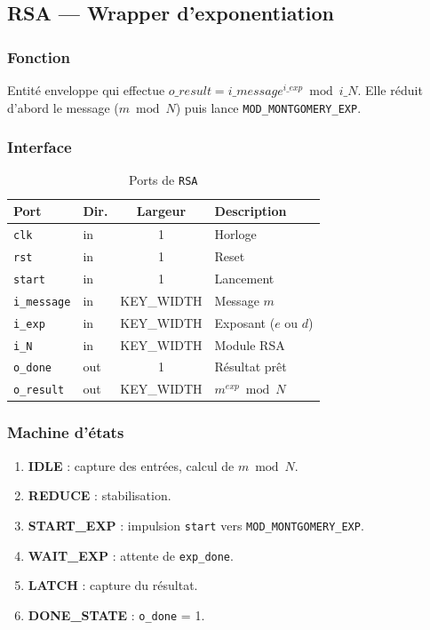 \documentclass[12pt,a4paper]{report}
\begin{document}
\subsection{RSA --- Wrapper d'exponentiation}
\label{sec:rsa}

\subsubsection{Fonction}
Entité enveloppe qui effectue $o\_result = i\_message^{i\_exp} \bmod i\_N$.
Elle réduit d'abord le message ($m \bmod N$) puis lance
\texttt{MOD\_MONTGOMERY\_EXP}.

\subsubsection{Interface}
\begin{table}[H]
\centering
\caption{Ports de \texttt{RSA}}
\begin{tabular}{llcp{5cm}}
\toprule
\textbf{Port} & \textbf{Dir.} & \textbf{Largeur} & \textbf{Description} \\
\midrule
\texttt{clk}       & in  & 1 & Horloge \\
\texttt{rst}       & in  & 1 & Reset \\
\texttt{start}     & in  & 1 & Lancement \\
\texttt{i\_message} & in  & KEY\_WIDTH & Message $m$ \\
\texttt{i\_exp}     & in  & KEY\_WIDTH & Exposant ($e$ ou $d$) \\
\texttt{i\_N}       & in  & KEY\_WIDTH & Module RSA \\
\texttt{o\_done}    & out & 1 & Résultat prêt \\
\texttt{o\_result}  & out & KEY\_WIDTH & $m^{exp} \bmod N$ \\
\bottomrule
\end{tabular}
\end{table}

\subsubsection{Machine d'états}
\begin{enumerate}
  \item \textbf{IDLE} : capture des entrées, calcul de $m \bmod N$.
  \item \textbf{REDUCE} : stabilisation.
  \item \textbf{START\_EXP} : impulsion \texttt{start} vers
        \texttt{MOD\_MONTGOMERY\_EXP}.
  \item \textbf{WAIT\_EXP} : attente de \texttt{exp\_done}.
  \item \textbf{LATCH} : capture du résultat.
  \item \textbf{DONE\_STATE} : \texttt{o\_done} = 1.
\end{enumerate}
\end{document}
